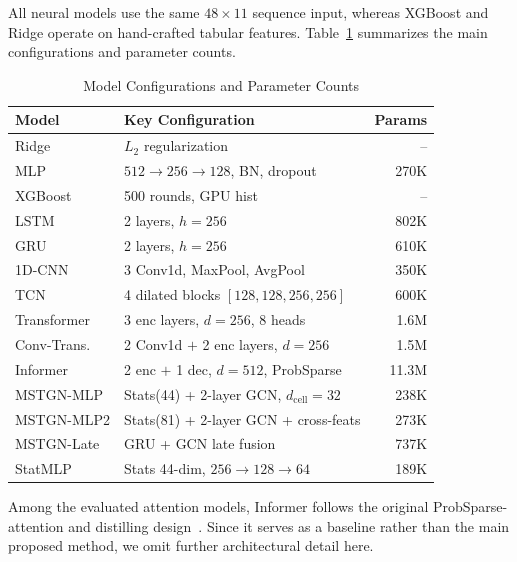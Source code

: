 \documentclass[sigconf,anonymous]{acmart}%
\begin{document}
All neural models use the same $48 \times 11$ sequence input, whereas XGBoost and Ridge operate on hand-crafted tabular features. Table~\ref{tab:model_configs} summarizes the main configurations and parameter counts.

\begin{table}[t]
    \centering
    \caption{Model Configurations and Parameter Counts}
    \label{tab:model_configs}
    \begin{tabular}{llr}
        \toprule
        \textbf{Model} & \textbf{Key Configuration} & \textbf{Params} \\
        \midrule
        Ridge & $L_2$ regularization & -- \\
        MLP & $512{\to}256{\to}128$, BN, dropout & 270K \\
        XGBoost & 500 rounds, GPU hist & -- \\
        \midrule
        LSTM & 2 layers, $h{=}256$ & 802K \\
        GRU & 2 layers, $h{=}256$ & 610K \\
        \midrule
        1D-CNN & 3 Conv1d, MaxPool, AvgPool & 350K \\
        TCN & 4 dilated blocks $[128,128,256,256]$ & 600K \\
        \midrule
        Transformer & 3 enc layers, $d{=}256$, 8 heads & 1.6M \\
        Conv-Trans. & 2 Conv1d $+$ 2 enc layers, $d{=}256$ & 1.5M \\
        Informer & 2 enc $+$ 1 dec, $d{=}512$, ProbSparse & 11.3M \\
        \midrule
        MSTGN-MLP & Stats(44) + 2-layer GCN, $d_\text{cell}{=}32$ & 238K \\
        MSTGN-MLP2 & Stats(81) + 2-layer GCN + cross-feats & 273K \\
        MSTGN-Late & GRU + GCN late fusion & 737K \\
        StatMLP & Stats 44-dim, $256{\to}128{\to}64$ & 189K \\
        \bottomrule
    \end{tabular}
\end{table}

Among the evaluated attention models, Informer follows the original ProbSparse-attention and distilling design~\cite{zhou2021informer}. Since it serves as a baseline rather than the main proposed method, we omit further architectural detail here.

\end{document}
